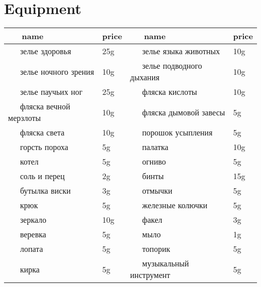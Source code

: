 \documentclass[a5paper,11pt]{book}
\begin{document}
\chapter{Equipment}

\noindent
{}
\setlength\tabcolsep{0pt}
\setlength\LTleft{0pt}
\setlength\LTright{0pt}
\begin{longtable}{p{}P{0.1\textwidth}p{0.4\textwidth}P{0.1\textwidth}}
  \textbf{\ \ \ name}
  & \textbf{price}
  & \textbf{\ \ \ name}
  & \textbf{price}
  \\
  \hline
  \ \ \ зелье здоровья                  &  25g &
  \ \ \ зелье языка животных            &  10g \\
  \ \ \ зелье ночного зрения            &  10g &
  \ \ \ зелье подводного дыхания        &  10g \\
  \ \ \ зелье паучьих ног               &  25g &
  \ \ \ фляска кислоты                  &  10g \\
  \ \ \ фляска вечной мерзлоты          &  10g &
  \ \ \ фляска дымовой завесы           &   5g \\
  \ \ \ фляска света                    &  10g &
  \ \ \ порошок усыпления               &   5g \\
  \ \ \ горсть пороха                   &   5g &
  \ \ \ палатка                         &  10g \\
  \ \ \ котел                           &   5g &
  \ \ \ огниво                          &   5g \\
  \ \ \ соль и перец                    &   2g &
  \ \ \ бинты                           &  15g \\
  \ \ \ бутылка виски                   &   3g &
  \ \ \ отмычки                         &   5g \\
  \ \ \ крюк                            &   5g &
  \ \ \ железные колючки                &   5g \\
  \ \ \ зеркало                         &  10g &
  \ \ \ факел                           &   3g \\
  \ \ \ веревка                         &   5g &
  \ \ \ мыло                            &   1g \\
  \ \ \ лопата                          &   5g &
  \ \ \ топорик                         &   5g \\
  \ \ \ кирка                           &   5g &
  \ \ \ музыкальный инструмент          &   5g
  \\

\end{longtable}
\end{document}
